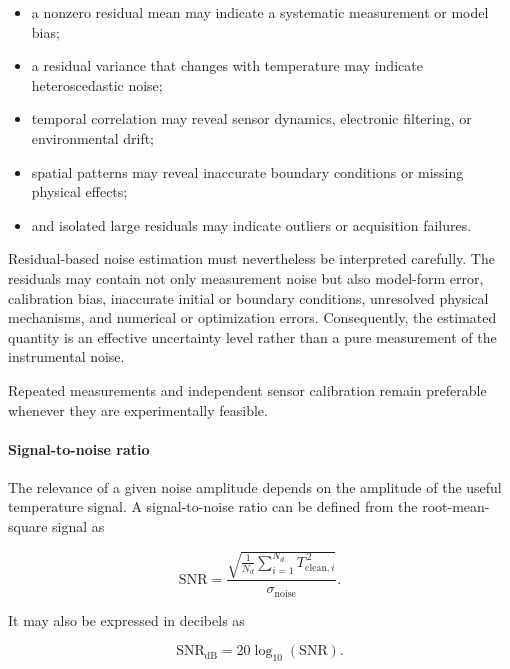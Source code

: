 \begin{itemize}
    \item a nonzero residual mean may indicate a systematic measurement or model
    bias;
    \item a residual variance that changes with temperature may indicate
    heteroscedastic noise;
    \item temporal correlation may reveal sensor dynamics, electronic filtering,
    or environmental drift;
    \item spatial patterns may reveal inaccurate boundary conditions or missing
    physical effects;
    \item and isolated large residuals may indicate outliers or acquisition
    failures.
\end{itemize}

Residual-based noise estimation must nevertheless be interpreted carefully.
The residuals may contain not only measurement noise but also model-form error,
calibration bias, inaccurate initial or boundary conditions, unresolved
physical mechanisms, and numerical or optimization errors. Consequently, the
estimated quantity is an effective uncertainty level rather than a pure
measurement of the instrumental noise.

Repeated measurements and independent sensor calibration remain preferable
whenever they are experimentally feasible.

\paragraph{Signal-to-noise ratio}

The relevance of a given noise amplitude depends on the amplitude of the useful
temperature signal. A signal-to-noise ratio can be defined from the root-mean-
square signal as

\begin{equation}
\mathrm{SNR}
=
\frac{
\sqrt{
\displaystyle
\frac{1}{N_d}
\sum_{i=1}^{N_d}
T_{\mathrm{clean},i}^{\,2}
}
}{
\sigma_{\mathrm{noise}}
}.
\end{equation}

It may also be expressed in decibels as

\begin{equation}
\mathrm{SNR}_{\mathrm{dB}}
=
20
\log_{10}
\left(
\mathrm{SNR}
\right).
\end{equation}

